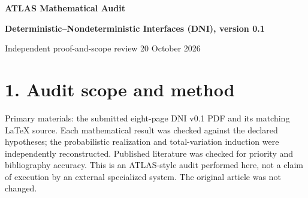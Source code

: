 \documentclass[11pt,letterpaper]{article}
\begin{document}
\begin{center}
{\LARGE\bfseries\color{dark} ATLAS Mathematical Audit}\par\vspace{4pt}
{\large\bfseries Deterministic--Nondeterministic Interfaces (DNI), version 0.1}\par\vspace{6pt}
{\small Independent proof-and-scope review \textbullet{} 20 October 2026}
\end{center}
\noindent{}

\section*{1. Audit scope and method}
Primary materials: the submitted eight-page DNI v0.1 PDF and its matching LaTeX source. Each mathematical result was checked against the declared hypotheses; the probabilistic realization and total-variation induction were independently reconstructed. Published literature was checked for priority and bibliography accuracy. This is an ATLAS-style audit performed here, not a claim of execution by an external specialized system. The original article was not changed.
\end{document}
